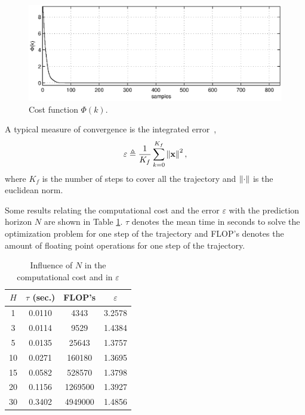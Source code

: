 \documentclass[conference]{IEEEtran} %
\begin{document}
\begin{figure}
	\centering
    \includegraphics[width=.95\linewidth]{Figures/cost.eps}
    \caption{Cost function $\Phi(k)$.}
    \label{fig:cost}
\end{figure}

A typical measure of convergence is the integrated error~\cite{essen01},
\begin{equation*}
	\varepsilon \triangleq \frac{1}{K_f}\sum_{k=0}^{K_f}\left\|{\bf x}\right\|^2,
\end{equation*}
where $K_f$ is the number of steps to cover all the trajectory and $\left\|{\bf\cdot}\right\|$ is the euclidean norm.

Some results relating the computational cost and the error $\varepsilon$ with the prediction horizon $N$ are shown in Table \ref{table:table1}. $\tau$ denotes the mean time in seconds to solve the optimization problem for one step of the trajectory and FLOP's denotes the amount of floating point operations for one step of the trajectory.

\begin{table}[H]
	\renewcommand{\arraystretch}{1.5}
	\caption{Influence of $N$ in the computational cost and in $\varepsilon$}
	\label{table:table1}
	\centering
	\begin{tabular}{c|c|c|c}
		\hline
		$H$ & $\tau$ (sec.) & FLOP's & $\varepsilon$ \\
		\hline\hline
		1  & 0.0110 & 4343    & 3.2578  \\
		3  & 0.0114 & 9529    & 1.4384  \\
		5  & 0.0135 & 25643   & 1.3757  \\
		10 & 0.0271 & 160180  & 1.3695  \\
		15 & 0.0582 & 528570  & 1.3798  \\
		20 & 0.1156 & 1269500 & 1.3927  \\
		30 & 0.3402 & 4949000 & 1.4856  \\
		\hline
	\end{tabular}
\end{table}
\end{document}
